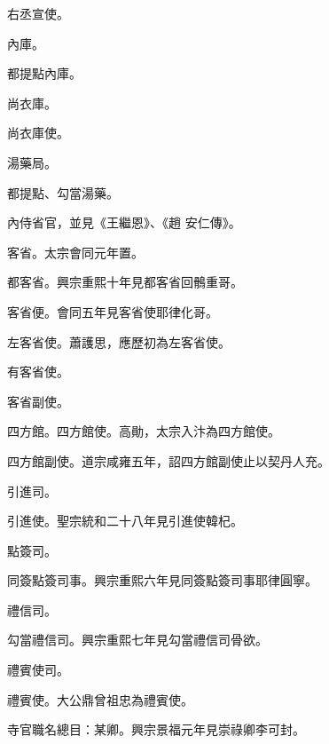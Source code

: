 \begin{pinyinscope}
 右丞宣使。



 內庫。



 都提點內庫。



 尚衣庫。



 尚衣庫使。



 湯藥局。



 都提點、勾當湯藥。



 內侍省官，並見《王繼恩》、《趙
 安仁傳》。



 客省。太宗會同元年置。



 都客省。興宗重熙十年見都客省回鶻重哥。



 客省便。會同五年見客省使耶律化哥。



 左客省使。蕭護思，應歷初為左客省使。



 有客省使。



 客省副使。



 四方館。四方館使。高勛，太宗入汴為四方館使。



 四方館副使。道宗咸雍五年，詔四方館副使止以契丹人充。



 引進司。



 引進使。聖宗統和二十八年見引進使韓杞。



 點簽司。



 同簽點簽司事。興宗重熙六年見同簽點簽司事耶律圓寧。



 禮信司。



 勾當禮信司。興宗重熙七年見勾當禮信司骨欲。



 禮賓使司。



 禮賓使。大公鼎曾祖忠為禮賓使。



 寺官職名總目：某卿。興宗景福元年見崇祿卿李可封。




\end{pinyinscope}
